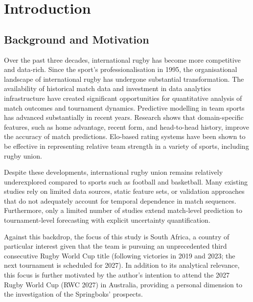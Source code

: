 \documentclass[12pt,a4paper,onecolumn]{article}
\begin{document}
\setcounter{page}{1}

{\footnotesize
\tableofcontents
}
\clearpage

\clearpage
{}
\setcounter{page}{1}

\section{Introduction}

\subsection{Background and Motivation}

Over the past three decades, international rugby has become more competitive and data-rich. \cite{OBrien2003} Since the sport's professionalisation in 1995, the organisational landscape of international rugby has undergone substantial transformation. \cite{Hutchins2016} The availability of historical match data and investment in data analytics infrastructure have created significant opportunities for quantitative analysis of match outcomes and tournament dynamics. Predictive modelling in team sports has advanced substantially in recent years. 
\cite{Bunker2022} Research shows that domain-specific features, such as home advantage, recent form, and head-to-head history, improve the accuracy of match predictions. \cite{BunkerThabtah2019,Thomas2008} Elo-based rating systems have been shown to be effective in representing relative team strength in a variety of sports, including rugby union. \cite{Hvattum2010,Elo1978}

Despite these developments, international rugby union remains relatively underexplored compared to sports such as football and basketball. \cite{Bunker2022} Many existing studies rely on limited data sources, static feature sets, or validation approaches that do not adequately account for temporal dependence in match sequences. \cite{Bergmeir2012} Furthermore, only a limited number of studies extend match-level prediction to tournament-level forecasting with explicit uncertainty quantification. \cite{Guo2017,Leitner2010}

Against this backdrop, the focus of this study is South Africa, a country of particular interest given that the team is pursuing an unprecedented third consecutive Rugby World Cup title (following victories in 2019 and 2023; the next tournament is scheduled for 2027). In addition to its analytical relevance, this focus is further motivated by the author's intention to attend the 2027 Rugby World Cup (RWC 2027) in Australia, providing a personal dimension to the investigation of the Springboks' prospects.
\end{document}
